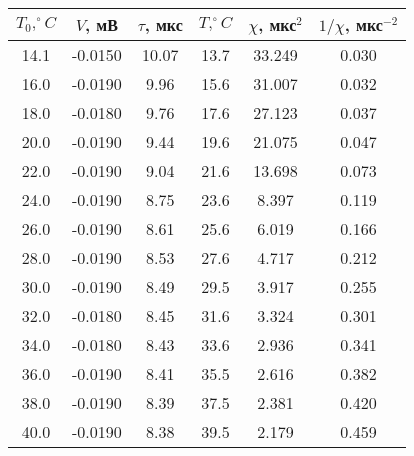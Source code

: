 \begin{tabular}{cccccc}
\toprule
$T_0,^{\circ} C$ & $V$, мВ & $\tau$, мкс & $T,^{\circ} C$ & $\chi$, мкс$^2$ & $1/\chi$, мкс$^{-2}$ \\
\midrule
14.1 & -0.0150 & 10.07 & 13.7 & 33.249 & 0.030 \\
16.0 & -0.0190 & 9.96 & 15.6 & 31.007 & 0.032 \\
18.0 & -0.0180 & 9.76 & 17.6 & 27.123 & 0.037 \\
20.0 & -0.0190 & 9.44 & 19.6 & 21.075 & 0.047 \\
22.0 & -0.0190 & 9.04 & 21.6 & 13.698 & 0.073 \\
24.0 & -0.0190 & 8.75 & 23.6 & 8.397 & 0.119 \\
26.0 & -0.0190 & 8.61 & 25.6 & 6.019 & 0.166 \\
28.0 & -0.0190 & 8.53 & 27.6 & 4.717 & 0.212 \\
30.0 & -0.0190 & 8.49 & 29.5 & 3.917 & 0.255 \\
32.0 & -0.0180 & 8.45 & 31.6 & 3.324 & 0.301 \\
34.0 & -0.0180 & 8.43 & 33.6 & 2.936 & 0.341 \\
36.0 & -0.0190 & 8.41 & 35.5 & 2.616 & 0.382 \\
38.0 & -0.0190 & 8.39 & 37.5 & 2.381 & 0.420 \\
40.0 & -0.0190 & 8.38 & 39.5 & 2.179 & 0.459 \\
\bottomrule
\end{tabular}
